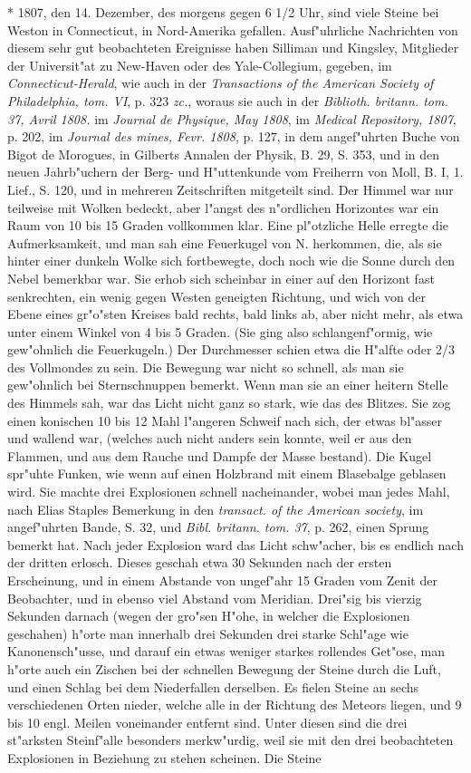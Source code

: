 \documentclass[a4paper, 11pt, oneside, polutonikogreek, german]{article}
\begin{document}
* 1807, den 14. Dezember, des morgens gegen 6 1/2 Uhr, sind viele Steine bei Weston in Connecticut, in Nord-Amerika gefallen. Ausf"uhrliche Nachrichten von diesem sehr gut beobachteten Ereignisse haben Silliman und Kingsley, Mitglieder der Universit"at zu New-Haven oder des Yale-Collegium, gegeben, im \emph{Connecticut-Herald}, wie auch in der \emph{Transactions of the American Society of Philadelphia, tom. VI}, p. 323 \emph{zc.}, woraus sie auch in der \emph{Biblioth. britann. tom. 37, Avril 1808.} im \emph{Journal de Physique, May 1808}, im \emph{Medical Repository, 1807}, p. 202, im \emph{Journal des mines, Fevr. 1808}, p. 127, in dem angef"uhrten Buche von Bigot de Morogues, in Gilberts Annalen der Physik, B. 29, S. 353, und in den neuen Jahrb"uchern der Berg- und H"uttenkunde vom Freiherrn von Moll, B. I, 1. Lief., S. 120, und in mehreren Zeitschriften mitgeteilt sind. Der Himmel war nur teilweise mit Wolken bedeckt, aber l"angst des n"ordlichen Horizontes war ein Raum von 10 bis 15 Graden vollkommen klar. Eine pl"otzliche Helle erregte die Aufmerksamkeit, und man sah eine Feuerkugel von N. herkommen, die, als sie hinter einer dunkeln Wolke sich fortbewegte, doch noch wie die Sonne durch den Nebel bemerkbar war. Sie erhob sich scheinbar in einer auf den Horizont fast senkrechten, ein wenig gegen Westen geneigten Richtung, und wich von der Ebene eines gr"o"sten Kreises bald rechts, bald links ab, aber nicht mehr, als etwa unter einem Winkel von 4 bis 5 Graden. (Sie ging also schlangenf"ormig, wie gew"ohnlich die Feuerkugeln.) Der Durchmesser schien etwa die H"alfte oder 2/3 des Vollmondes zu sein. Die Bewegung war nicht so schnell, als man sie gew"ohnlich bei Sternschnuppen bemerkt. Wenn man sie an einer heitern Stelle des Himmels sah, war das Licht nicht ganz so stark, wie das des Blitzes. Sie zog einen konischen 10 bis 12 Mahl l"angeren Schweif nach sich, der etwas bl"asser und wallend war, (welches auch nicht anders sein konnte, weil er aus den Flammen, und aus dem Rauche und Dampfe der Masse bestand). Die Kugel spr"uhte Funken, wie wenn auf einen Holzbrand mit einem Blasebalge geblasen wird. Sie machte drei Explosionen schnell nacheinander, wobei man jedes Mahl, nach Elias Staples Bemerkung in den \emph{transact. of the American society}, im angef"uhrten Bande, S. 32, und \emph{Bibl. britann. tom. 37}, p. 262, einen Sprung bemerkt hat. Nach jeder Explosion ward das Licht schw"acher, bis es endlich nach der dritten erlosch. Dieses geschah etwa 30 Sekunden nach der ersten Erscheinung, und in einem Abstande von ungef"ahr 15 Graden vom Zenit der Beobachter, und in ebenso viel Abstand vom Meridian. Drei"sig bis vierzig Sekunden darnach (wegen der gro"sen H"ohe, in welcher die Explosionen geschahen) h"orte man innerhalb drei Sekunden drei starke Schl"age wie Kanonensch"usse, und darauf ein etwas weniger starkes rollendes Get"ose, man h"orte auch ein Zischen bei der schnellen Bewegung der Steine durch die Luft, und einen Schlag bei dem Niederfallen derselben. Es fielen Steine an sechs verschiedenen Orten nieder, welche alle in der Richtung des Meteors liegen, und 9 bis 10 engl. Meilen voneinander entfernt sind. Unter diesen sind die drei st"arksten Steinf"alle besonders merkw"urdig, weil sie mit den drei beobachteten Explosionen in Beziehung zu stehen scheinen. Die Steine 
\end{document}
